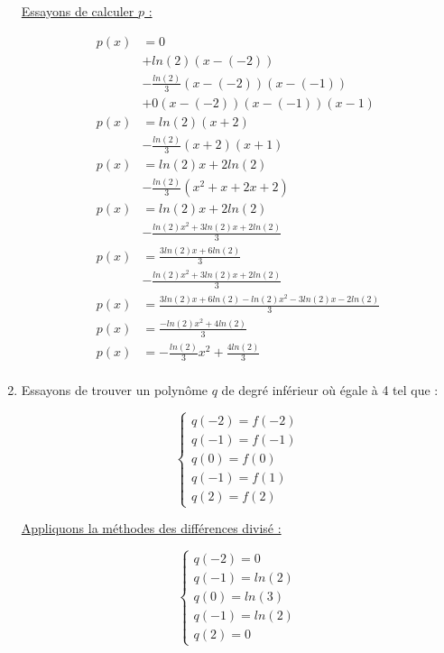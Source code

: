 \documentclass[12pt, letterpaper]{article}
\begin{document}
\begin{enumerate}
  \underline{Essayons de calculer $p$ :}

  \begin{equation*}
    \begin{split}
      p(x) & = 0 \\
      & + ln(2) (x - (-2)) \\
      & - \frac{ln(2)}{3} (x - (-2)) (x - (-1)) \\
      & + 0 (x - (-2)) (x - (-1)) (x - 1) \\
      p(x) & = ln(2) (x + 2) \\
      & - \frac{ln(2)}{3} (x + 2) (x + 1) \\
      p(x) & = ln(2)x + 2ln(2) \\
      & - \frac{ln(2)}{3} (x^2 + x + 2x + 2)\\
      p(x) & = ln(2)x + 2ln(2) \\
      & - \frac{ln(2)x^2 + 3ln(2)x + 2ln(2)}{3}\\
      p(x) & = \frac{3ln(2)x + 6ln(2)}{3} \\
      & - \frac{ln(2)x^2 + 3ln(2)x + 2ln(2)}{3}\\
      p(x) & = \frac{3ln(2)x + 6ln(2) - ln(2)x^2 - 3ln(2)x -
        2ln(2)}{3}\\
      p(x) & = \frac{- ln(2)x^2 + 4ln(2)}{3}\\
      p(x) & = - \frac{ln(2)}{3}x^2 + \frac{4ln(2)}{3}\\
    \end{split}
  \end{equation*}

\item Essayons de trouver un polynôme $q$ de degré inférieur où égale
  à 4 tel que :

  \begin{equation*}
    \left\{
    \begin{array}{l}
      q(-2) = f(-2) \\
      q(-1) = f(-1) \\
      q(0) = f(0) \\
      q(-1) = f(1) \\
      q(2) = f(2) 
    \end{array}
    \right.
  \end{equation*}

  \underline{Appliquons la méthodes des différences divisé :}

  \begin{equation*}
    \left\{
    \begin{array}{l}
      q(-2) = 0 \\
      q(-1) = ln(2) \\
      q(0) = ln(3) \\
      q(-1) = ln(2) \\
      q(2) = 0 
    \end{array}
    \right.
  \end{equation*}


\end{enumerate}
\end{document}
